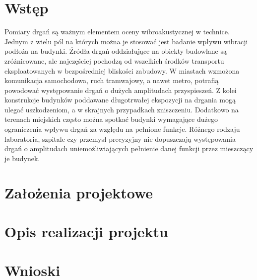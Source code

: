 \documentclass[a4paper,12pt]{mwart}
\begin{document}
    \section{Wstęp}

    Pomiary drgań są ważnym elementem oceny wibroakustycznej w technice. Jednym z wielu pól na których można je stosować jest badanie wpływu wibracji podłoża na budynki. Źródła drgań oddziałujące na obiekty budowlane są zróżnicowane, ale najczęściej pochodzą od wszelkich środków transportu eksploatowanych w bezpośredniej bliskości zabudowy. W miastach wzmożona komunikacja samochodowa, ruch tramwajowy, a nawet metro, potrafią powodować występowanie drgań o dużych amplitudach przyspieszeń. Z kolei konstrukcje budynków poddawane długotrwałej ekspozycji na drgania mogą ulegać uszkodzeniom, a w skrajnych przypadkach zniszczeniu. Dodatkowo na terenach miejskich często można spotkać budynki wymagające dużego ograniczenia wpływu drgań za względu na pełnione funkcje. Różnego rodzaju laboratoria, szpitale czy przemysł precyzyjny nie dopuszczają występowania drgań o amplitudach uniemożliwiających pełnienie danej funkcji przez mieszczący je budynek.

    \section{Założenia projektowe}

    \section{Opis realizacji projektu}

    \section{Wnioski}
\end{document}
